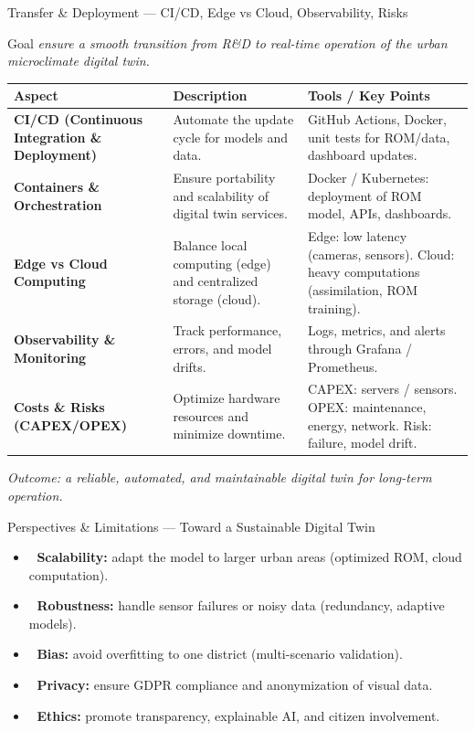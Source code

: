 \documentclass{beamer}
\begin{document}
\begin{frame}{Transfer \& Deployment — CI/CD, Edge vs Cloud, Observability, Risks}
\centering
\tiny
\begin{block}{Goal}
    \textit{ensure a smooth transition from R\&D to real-time operation of the urban microclimate digital twin.}
\end{block}
\vspace{0.4cm}
\begin{tabular}{|p{2.5cm}|p{3.5cm}|p{4.2cm}|}
\hline
\textbf{Aspect} & \textbf{Description} & \textbf{Tools / Key Points} \\
\hline
\textbf{CI/CD (Continuous Integration \& Deployment)} &
Automate the update cycle for models and data. &
GitHub Actions, Docker, unit tests for ROM/data, dashboard updates. \\
\hline
\textbf{Containers \& Orchestration} &
Ensure portability and scalability of digital twin services. &
Docker / Kubernetes: deployment of ROM model, APIs, dashboards. \\
\hline
\textbf{Edge vs Cloud Computing} &
Balance local computing (edge) and centralized storage (cloud). &
Edge: low latency (cameras, sensors).  
Cloud: heavy computations (assimilation, ROM training). \\
\hline
\textbf{Observability \& Monitoring} &
Track performance, errors, and model drifts. &
Logs, metrics, and alerts through Grafana / Prometheus. \\
\hline
\textbf{Costs \& Risks (CAPEX/OPEX)} &
Optimize hardware resources and minimize downtime. &
CAPEX: servers / sensors.  
OPEX: maintenance, energy, network.  
Risk: failure, model drift. \\
\hline
\end{tabular}

\vspace{0.3cm}
\textit{Outcome: a reliable, automated, and maintainable digital twin for long-term operation.}
\end{frame}


\begin{frame}{Perspectives \& Limitations — Toward a Sustainable Digital Twin}

\vspace{3mm}
\begin{itemize}
    \item 🔹 \textbf{Scalability:} adapt the model to larger urban areas (optimized ROM, cloud computation).  
    \item 🔹 \textbf{Robustness:} handle sensor failures or noisy data (redundancy, adaptive models).  
    \item 🔹 \textbf{Bias:} avoid overfitting to one district (multi-scenario validation).  
    \item 🔹 \textbf{Privacy:} ensure GDPR compliance and anonymization of visual data.  
    \item 🔹 \textbf{Ethics:} promote transparency, explainable AI, and citizen involvement.  
\end{itemize}

\end{frame}
\end{document}
